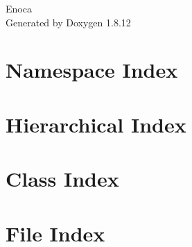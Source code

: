 \documentclass[twoside]{book}
\newcommand{\+}{\discretionary{\mbox{\scriptsize$\hookleftarrow$}}{}{}}
\newcommand{\clearemptydoublepage}{%
  \newpage{\pagestyle{empty}\cleardoublepage}%
}
\begin{document}
\hypersetup{pageanchor=false,
             bookmarksnumbered=true,
             pdfencoding=unicode
            }
\begin{titlepage}
\vspace*{7cm}
\begin{center}%
{\Large Enoca }\\
\vspace*{1cm}
{\large Generated by Doxygen 1.8.12}\\
\end{center}
\end{titlepage}
\clearemptydoublepage
{}
\tableofcontents
\clearemptydoublepage
{}
\hypersetup{pageanchor=true}

\chapter{Namespace Index}

\chapter{Hierarchical Index}

\chapter{Class Index}

\chapter{File Index}

\end{document}
